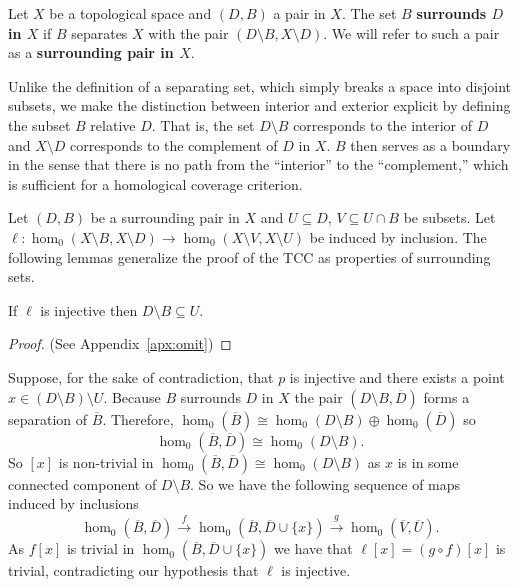 
\begin{definition}
  Let $X$ be a topological space and $(D,B)$ a pair in $X$.
  The set $B$ \textbf{surrounds $D$ in $X$} if $B$ separates $X$ with the pair $(D\setminus B, X\setminus D)$.
  We will refer to such a pair as a \textbf{surrounding pair in $X$}.
\end{definition}

Unlike the definition of a separating set, which simply breaks a space into disjoint subsets, we make the distinction between interior and exterior explicit by defining the subset $B$ relative $D$.
That is, the set $D\setminus B$ corresponds to the interior of $D$ and $X\setminus D$ corresponds to the complement of $D$ in $X$.
$B$ then serves as a boundary in the sense that there is no path from the ``interior'' to the ``complement,'' which is sufficient for a homological coverage criterion.

Let $(D, B)$ be a surrounding pair in $X$ and $U\subseteq D$, $V\subseteq U\cap B$ be subsets.
Let $\ell: \hom_0(X\setminus B, X\setminus D)\to \hom_0(X\setminus V, X\setminus U)$ be induced by inclusion.
The following lemmas generalize the proof of the TCC as properties of surrounding sets.

\begin{lemma}\label{lem:coverage}
  If $\ell$ is injective then $D\setminus B\subseteq U$.
\end{lemma}
\begin{proof}
  (See Appendix~\ref{apx:omit})
\end{proof}
\proofatend
    Suppose, for the sake of contradiction, that $p$ is injective and there exists a point $x\in (D\setminus B)\setminus U$.
    Because $B$ surrounds $D$ in $X$ the pair $(D\setminus B, \overline{D})$ forms a separation of $\overline{B}$.
    Therefore, $\hom_0(\overline{B})\cong \hom_0(D\setminus B)\oplus \hom_0(\overline{D})$ so
    \[ \hom_0(\overline{B}, \overline{D})\cong \hom_0(D\setminus B). \]
    So $[x]$ is non-trivial in $\hom_0(\overline{B},\overline{D})\cong \hom_0(D\setminus B)$ as $x$ is in some connected component of $D\setminus B$.
    So we have the following sequence of maps induced by inclusions
    \[ \hom_0(\overline{B},\overline{D})\xrightarrow{f} \hom_0(\overline{B},\overline{D}\cup\{x\})\xrightarrow{g} \hom_0(\overline{V},\overline{U}).\]
    As $f[x]$ is trivial in $\hom_0(\overline{B},\overline{D}\cup\{x\})$ we have that $\ell[x] = (g\circ f)[x]$ is trivial, contradicting our hypothesis that $\ell$ is injective.
\endproofatend

